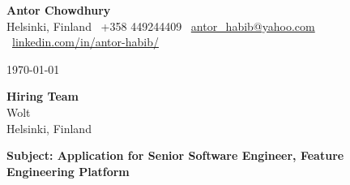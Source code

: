 \documentclass[a4paper,11pt]{article}
\begin{document}
\selectfont
\textbf{\Large Antor Chowdhury} \\
\selectfont
Helsinki, Finland \textbar\ +358 449244409 \textbar\ \href{mailto:antor_habib@yahoo.com}{antor\_habib@yahoo.com} \textbar\ \href{https://www.linkedin.com/in/antor-habib/}{linkedin.com/in/antor-habib/}

\vspace{15pt}

\selectfont
\today

\vspace{10pt}

\textbf{Hiring Team} \\
Wolt \\
Helsinki, Finland

\vspace{15pt}

\textbf{Subject: Application for Senior Software Engineer, Feature Engineering Platform}

\vspace{10pt}
\end{document}
